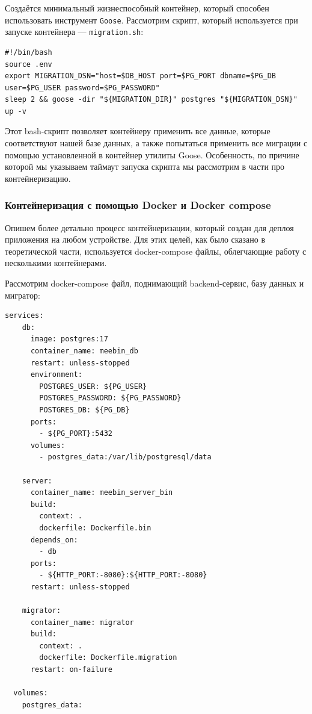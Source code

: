 \documentclass[diploma]{SCWorks}
\begin{document}
Создаётся минимальный жизнеспособный контейнер, который способен
использовать инструмент \texttt{Goose}. Рассмотрим скрипт, который используется
при запуске контейнера — \texttt{migration.sh}:
\begin{verbatim}
#!/bin/bash
source .env
export MIGRATION_DSN="host=$DB_HOST port=$PG_PORT dbname=$PG_DB user=$PG_USER password=$PG_PASSWORD"
sleep 2 && goose -dir "${MIGRATION_DIR}" postgres "${MIGRATION_DSN}" up -v
\end{verbatim}

Этот bash-скрипт позволяет контейнеру применить все данные, 
которые соответствуют нашей базе данных, а также попытаться применить все 
миграции с помощью установленной в контейнер утилиты Goose. Особенность, 
по причине которой мы указываем таймаут запуска скрипта мы рассмотрим в части 
про контейнеризацию.

\subsubsection{Контейнеризация с помощью Docker и Docker compose}

Опишем более детально процесс контейнеризации, который создан для деплоя 
приложения на любом устройстве. Для этих целей, как было сказано в 
теоретической части, используется docker-compose файлы, облегчающие работу с
несколькими контейнерами.

Рассмотрим docker-compose файл, поднимающий backend-сервис, базу данных и 
мигратор:
\begin{verbatim}
services:
    db:
      image: postgres:17
      container_name: meebin_db
      restart: unless-stopped
      environment:
        POSTGRES_USER: ${PG_USER}
        POSTGRES_PASSWORD: ${PG_PASSWORD}
        POSTGRES_DB: ${PG_DB}
      ports: 
        - ${PG_PORT}:5432
      volumes:
        - postgres_data:/var/lib/postgresql/data
  
    server:
      container_name: meebin_server_bin
      build:
        context: .
        dockerfile: Dockerfile.bin
      depends_on:
        - db
      ports:
        - ${HTTP_PORT:-8080}:${HTTP_PORT:-8080}
      restart: unless-stopped
  
    migrator:
      container_name: migrator
      build:
        context: .
        dockerfile: Dockerfile.migration
      restart: on-failure
  
  volumes:
    postgres_data:
\end{verbatim}
\end{document}

